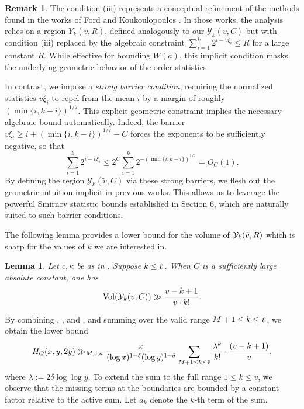 \documentclass{amsart}
\newtheorem{lemma}[theorem]{Lemma}
\theoremstyle{definition}
\newtheorem*{remark}{Remark}
\numberwithin{equation}{section}
\newcommand{\density}{\delta}
\DeclareMathOperator{\Vol}{Vol}
\begin{document}
\begin{remark}
	The condition (iii) represents a conceptual refinement of the methods found in the works of Ford \cite{ford2008distribution} and Koukoulopoulos \cite{koukoulopoulos2010generalized}. In those works, the analysis relies on a region $Y_k(\tilde{v},R)$, defined analogously to our $\mathcal{Y}_k(\tilde{v},C)$ but with condition (iii) replaced by the algebraic constraint $\sum_{i=1}^k 2^{i-v\xi_i} \le R$ for a large constant $R$. While effective for bounding $W(a)$, this implicit condition masks the underlying geometric behavior of the order statistics.
	
	In contrast, we impose a \textit{strong barrier condition}, requiring the normalized statistics $v\xi_i$ to repel from the mean $i$ by a margin of roughly $(\min\{i, k-i\})^{1/7}$. This explicit geometric constraint implies the necessary algebraic bound automatically. Indeed, the barrier $v\xi_i \geq i + (\min\{i, k-i\})^{1/7} - C$ forces the exponents to be sufficiently negative, so that
	$$ \sum_{i=1}^k 2^{i-v\xi_i} \leq 2^C \sum_{i=1}^k 2^{-(\min\{i, k-i\})^{1/7}} = O_C(1). $$
	By defining the region $\mathcal{Y}_k(\tilde{v},C)$ via these strong barriers, we flesh out the geometric intuition implicit in previous works. This allows us to leverage the powerful Smirnov statistic bounds established in Section 6, which are naturally suited to such barrier conditions.
\end{remark}
	The following lemma provides a lower bound for the volume of $\mathcal{Y}_k(\Tilde{v},R)$ which is sharp for the values of $k$ we are interested in.
	\begin{lemma}\label{lem LB Yk} Let $c,\kappa$ be as in . Suppose $k \leq \Tilde{v}$. When $C$ is a sufficiently large absolute constant, one has
		$$\Vol(\mathcal{Y}_k(\Tilde{v},C)) \gg \frac{v-k+1}{v \cdot k!}.$$
	\end{lemma}
	By combining , , and , and summing over the valid range $M+1 \leq k \leq \Tilde{v}$, we obtain the lower bound
	\begin{equation*}
		H_Q(x,y,2y) \gg_{M,c,\kappa} \frac{x}{(\log x)^{1-\density}(\log y)^{1+\density}}    \sum_{M+1 \leq k \leq \Tilde{v}} \frac{\lambda^k}{k!}\cdot\frac{(v-k+1)}{v},
	\end{equation*}
	where $\lambda := 2\density \log \log y$. To extend the sum to the full range $1 \leq k \leq v$, we observe that the missing terms at the boundaries are bounded by a constant factor relative to the active sum. Let $a_k$ denote the $k$-th term of the sum. 
	
\end{document}
